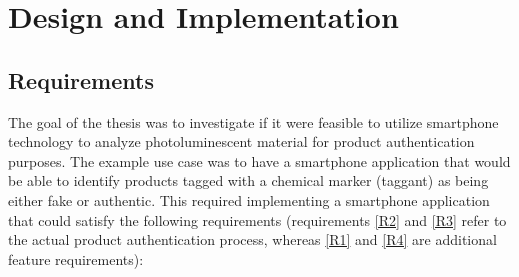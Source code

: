 \documentclass[thesis.tex]{subfiles}
\begin{document}
\chapter{Design and Implementation}
\label{chapter:design-implementation}

\section{Requirements}

The goal of the thesis was to investigate if it were feasible to utilize smartphone technology to analyze photoluminescent material for product authentication purposes. The example use case was to have a smartphone application that would be able to identify products tagged with a chemical marker (taggant) as being either fake or authentic. This required implementing a smartphone application that could satisfy the following requirements (requirements \ref{R2} and \ref{R3} refer to the actual product authentication process, whereas \ref{R1} and \ref{R4} are additional feature requirements):
\end{document}
